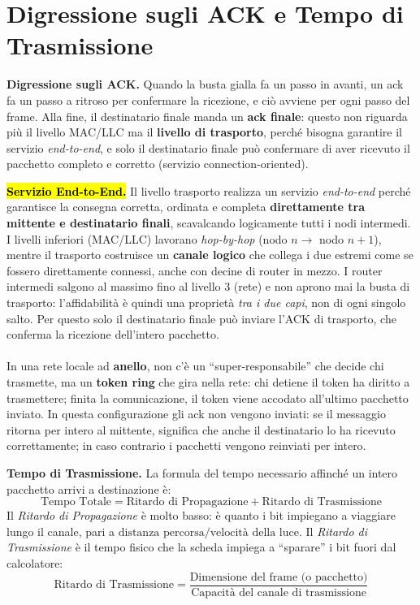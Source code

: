 \documentclass[11pt,a4paper]{report}
\newcommand{\pagemark}[1]{\marginpar{\footnotesize\color{gray}p.#1}}
\begin{document}
\section{Digressione sugli ACK e Tempo di Trasmissione}\pagemark{12}
\textbf{Digressione sugli ACK.} Quando la busta gialla fa un passo in avanti, un ack fa un passo a ritroso per confermare la ricezione, e ciò avviene per ogni passo del frame. Alla fine, il destinatario finale manda un \textbf{ack finale}: questo non riguarda più il livello MAC/LLC ma il \textbf{livello di trasporto}, perché bisogna garantire il servizio \emph{end-to-end}, e solo il destinatario finale può confermare di aver ricevuto il pacchetto completo e corretto (servizio connection-oriented).

\hl{\textbf{Servizio End-to-End.}} Il livello trasporto realizza un servizio
\emph{end-to-end} perché garantisce la consegna corretta, ordinata e completa
\textbf{direttamente tra mittente e destinatario finali}, scavalcando
logicamente tutti i nodi intermedi. I livelli inferiori (MAC/LLC) lavorano
\emph{hop-by-hop} (nodo $n \to$ nodo $n+1$), mentre il trasporto costruisce un
\textbf{canale logico} che collega i due estremi come se fossero direttamente
connessi, anche con decine di router in mezzo. I router intermedi salgono al
massimo fino al livello $3$ (rete) e non aprono mai la busta di trasporto:
l'affidabilità è quindi una proprietà \emph{tra i due capi}, non di ogni singolo
salto. Per questo solo il destinatario finale può inviare l'ACK di trasporto, che
conferma la ricezione dell'intero pacchetto.\\
\vspace{1px}\\
In una rete locale ad \textbf{anello}, non c'è un ``super-responsabile'' che decide chi trasmette, ma un \textbf{token ring} che gira nella rete: chi detiene il token ha diritto a trasmettere; finita la comunicazione, il token viene accodato all'ultimo pacchetto inviato. In questa configurazione gli ack non vengono inviati: se il messaggio ritorna per intero al mittente, significa che anche il destinatario lo ha ricevuto correttamente; in caso contrario i pacchetti vengono reinviati per intero.

\textbf{Tempo di Trasmissione.} La formula del tempo necessario affinché un intero pacchetto arrivi a destinazione è:
\[ \text{Tempo Totale} = \text{Ritardo di Propagazione} + \text{Ritardo di Trasmissione} \]
Il \emph{Ritardo di Propagazione} è molto basso: è quanto i bit impiegano a viaggiare lungo il canale, pari a $\text{distanza percorsa}/\text{velocità della luce}$.
Il \emph{Ritardo di Trasmissione} è il tempo fisico che la scheda impiega a ``sparare'' i bit fuori dal calcolatore:
\[ \text{Ritardo di Trasmissione} = \frac{\text{Dimensione del frame (o pacchetto)}}{\text{Capacità del canale di trasmissione}} \]
\end{document}
